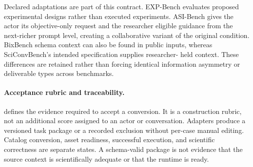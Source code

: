 Declared adaptations are part of this contract. EXP-Bench evaluates proposed
experimental designs rather than executed experiments. ASI-Bench gives the
actor its objective-only request and the researcher eligible guidance from
the next-richer prompt level, creating a collaborative variant of the
original condition. BixBench schema context can also be found in public
inputs, whereas SciConvBench's intended specification supplies researcher-
held context. These differences are retained rather than forcing identical
information asymmetry or deliverable types across benchmarks.

\paragraph{Acceptance rubric and traceability.}
 defines the evidence required to accept a
conversion. It is a construction rubric, not an additional score assigned
to an actor or conversation. Adapters produce a versioned task package or a
recorded exclusion without per-case manual editing. Catalog conversion,
asset readiness, successful execution, and scientific correctness are
separate states. A schema-valid package is not evidence that the source
context is scientifically adequate or that the runtime is ready.

